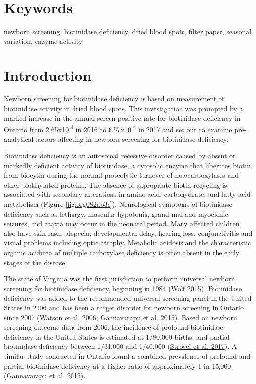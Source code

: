 \documentclass[review]{elsarticle}
\begin{document}
\section*{Keywords}
\label{sec:org9025038}
newborn screening, biotinidase deficiency, dried blood spots, filter
paper, seasonal variation, enzyme activity
\section*{Introduction}
\label{sec:org03f6cec}

Newborn screening for biotinidase deficiency is based on measurement
of biotinidase activity in dried blood spots. This investigation was
prompted by a marked increase in the annual screen positive rate for
biotinidase deficiency in Ontario from 2.65x10\textsuperscript{-4} in 2016 to
6.57x10\textsuperscript{-4} in 2017 and set out to examine pre-analytical factors
affecting in newborn screening for biotinidase deficiency.

Biotinidase deficiency is an autosomal recessive disorder caused by
absent or markedly deficient activity of biotinidase, a cytosolic
enzyme that liberates biotin from biocytin during the normal
proteolytic turnover of holocarboxylases and other biotinylated
proteins. The absence of appropriate biotin recycling is associated
with secondary alterations in amino acid, carbohydrate, and fatty acid
metabolism (Figure \ref{fig:org082ab3c}). Neurological symptoms of biotinidase
deficiency such as lethargy, muscular hypotonia, grand mal and
myoclonic seizures, and ataxia may occur in the neonatal period. Many
affected children also have skin rash, alopecia, developmental delay,
hearing loss, conjunctivitis and visual problems including optic
atrophy. Metabolic acidosis and the characteristic organic aciduria of
multiple carboxylase deficiency is often absent in the early stages of
the disease.

The state of Virginia was the first jurisdiction to perform universal
newborn screening for biotinidase deficiency, beginning in 1984 (\hyperlink{citeproc_bib_item_15}{Wolf 2015}). Biotinidase deficiency was added to the recommended
universal screening panel in the United States in 2006 and has been a
target disorder for newborn screening in Ontario since 2007 (\hyperlink{citeproc_bib_item_13}{Watson et al. 2006}; \hyperlink{citeproc_bib_item_5}{Gannavarapu et al. 2015}). Based on newborn screening
outcome data from 2006, the incidence of profound biotinidase
deficiency in the United States is estimated at 1/80,000 births, and
partial biotinidase deficiency between 1/31,000 and 1/40,000 (\hyperlink{citeproc_bib_item_10}{Strovel et al. 2017}). A similar study conducted in Ontario found a
combined prevalence of profound and partial biotinidase deficiency at
a higher ratio of approximately 1 in 15,000 (\hyperlink{citeproc_bib_item_5}{Gannavarapu et al. 2015}).
\end{document}
